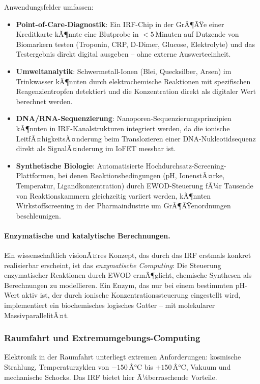 ﻿\documentclass[a4paper,12pt]{scrreprt}
\theoremstyle{definition}
\begin{document}
Anwendungsfelder umfassen:
\begin{itemize}
	\item \textbf{Point-of-Care-Diagnostik}: Ein IRF-Chip in der GrÃ¶ÃŸe einer
	Kreditkarte kÃ¶nnte eine Blutprobe in $< 5$\,Minuten auf Dutzende von
	Biomarkern testen (Troponin, CRP, D-Dimer, Glucose, Elektrolyte) und
	das Testergebnis direkt digital ausgeben -- ohne externe Auswerteeinheit.
	\item \textbf{Umweltanalytik}: Schwermetall-Ionen (Blei, Quecksilber,
	Arsen) im Trinkwasser kÃ¶nnten durch elektrochemische Reaktionen mit
	spezifischen Reagenzientropfen detektiert und die Konzentration direkt
	als digitaler Wert berechnet werden.
	\item \textbf{DNA/RNA-Sequenzierung}: Nanoporen-Sequenzierungsprinzipien
	kÃ¶nnten in IRF-Kanalstrukturen integriert werden, da die ionische
	LeitfÃ¤higkeitsÃ¤nderung beim Translozieren einer DNA-Nukleotidsequenz
	direkt als SignalÃ¤nderung im IoFET messbar ist.
	\item \textbf{Synthetische Biologie}: Automatisierte Hochdurchsatz-Screening-
	Plattformen, bei denen Reaktionsbedingungen (pH, IonenstÃ¤rke, Temperatur,
	Ligandkonzentration) durch EWOD-Steuerung fÃ¼r Tausende von Reaktionskammern
	gleichzeitig variiert werden, kÃ¶nnten Wirkstoffscreening in der
	Pharmaindustrie um GrÃ¶ÃŸenordnungen beschleunigen.
\end{itemize}

\paragraph{Enzymatische und katalytische Berechnungen.}
Ein wissenschaftlich visionÃ¤res Konzept, das durch das IRF erstmals konkret
realisierbar erscheint, ist das \emph{enzymatische Computing}: Die Steuerung
enzymatischer Reaktionen durch EWOD ermÃ¶glicht, chemische Synthesen als
Berechnungen zu modellieren. Ein Enzym, das nur bei einem bestimmten
pH-Wert aktiv ist, der durch ionische Konzentrationssteuerung eingestellt
wird, implementiert ein biochemisches logisches Gatter -- mit molekularer
MassivparallelitÃ¤t.

\subsubsection{Raumfahrt und Extremumgebungs-Computing}
\label{subsubsec:raumfahrt}

Elektronik in der Raumfahrt unterliegt extremen Anforderungen: kosmische
Strahlung, Temperaturzyklen von $-150$\,Â°C bis $+150$\,Â°C, Vakuum und
mechanische Schocks. Das IRF bietet hier Ã¼berraschende Vorteile.
\end{document}

